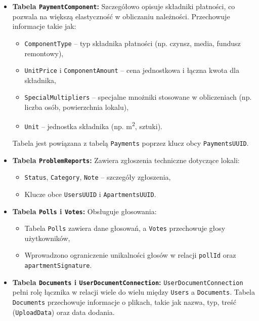 \begin{itemize}
    \item \textbf{Tabela \texttt{PaymentComponent}:}
    Szczegółowo opisuje składniki płatności, co pozwala na większą elastyczność w obliczaniu należności. Przechowuje informacje takie jak:
    \begin{itemize}
        \item \texttt{ComponentType} -- typ składnika płatności (np. czynsz, media, fundusz remontowy),
        \item \texttt{UnitPrice} i \texttt{ComponentAmount} -- cena jednostkowa i łączna kwota dla składnika,
        \item \texttt{SpecialMultipliers} -- specjalne mnożniki stosowane w obliczeniach (np. liczba osób, powierzchnia lokalu),
        \item \texttt{Unit} -- jednostka składnika (np. m\textsuperscript{2}, sztuki).
    \end{itemize}
    Tabela jest powiązana z tabelą \texttt{Payments} poprzez klucz obcy \texttt{PaymentsUUID}.

    \item \textbf{Tabela \texttt{ProblemReports}:}
    Zawiera zgłoszenia techniczne dotyczące lokali:
    \begin{itemize}
        \item \texttt{Status}, \texttt{Category}, \texttt{Note} -- szczegóły zgłoszenia,
        \item Klucze obce \texttt{UsersUUID} i \texttt{ApartmentsUUID}.
    \end{itemize}

    \item \textbf{Tabela \texttt{Polls} i \texttt{Votes}:}
    Obsługuje głosowania:
    \begin{itemize}
        \item Tabela \texttt{Polls} zawiera dane głosowań, a \texttt{Votes} przechowuje głosy użytkowników,
        \item Wprowadzono ograniczenie unikalności głosów w relacji \texttt{pollId} oraz \texttt{apartmentSignature}.
    \end{itemize}

    \item \textbf{Tabela \texttt{Documents} i \texttt{UserDocumentConnection}:}
    \texttt{UserDocumentConnection} pełni rolę łącznika w relacji wiele do wielu między \texttt{Users} a \texttt{Documents}. Tabela \texttt{Documents} przechowuje informacje o plikach, takie jak nazwa, typ, treść (\texttt{UploadData}) oraz data dodania.
    

\end{itemize}
